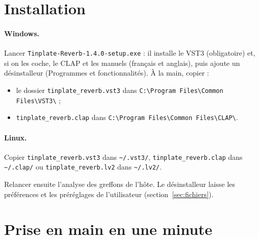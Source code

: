 \documentclass[a4paper,11pt]{article}
\begin{document}
\section{Installation}

\paragraph{Windows.} Lancer \texttt{Tinplate-Reverb-1.4.0-setup.exe} : il installe le VST3
(obligatoire) et, si on les coche, le CLAP et les manuels (français et anglais), puis ajoute
un désinstalleur (\og Programmes et fonctionnalités\fg). À la main, copier :
\begin{itemize}
\item le dossier \texttt{tinplate\_reverb.vst3} dans \verb|C:\Program Files\Common Files\VST3\| ;
\item \texttt{tinplate\_reverb.clap} dans \verb|C:\Program Files\Common Files\CLAP\|.
\end{itemize}

\paragraph{Linux.} Copier \texttt{tinplate\_reverb.vst3} dans \verb|~/.vst3/|,
\texttt{tinplate\_reverb.clap} dans \verb|~/.clap/| ou \texttt{tinplate\_reverb.lv2} dans
\verb|~/.lv2/|.

Relancer ensuite l'analyse des greffons de l'hôte. Le désinstalleur laisse les préférences et
les préréglages de l'utilisateur (section~\ref{sec:fichiers}).

\section{Prise en main en une minute}
\end{document}

